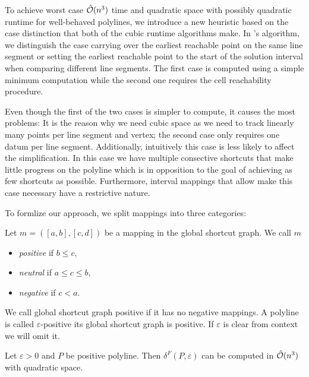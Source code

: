 To achieve worst case \(\hat{\mathcal{O}}(n^3)\) time and quadratic space with possibly quadratic runtime for well-behaved polylines, we introduce a new heuristic based on the case distinction that both of the cubic runtime algorithms make. In \citeauthor{polyline_simplification_has_cubic_complexity_bringmannetal}'s algorithm, we distinguish the case carrying over the earliest reachable point on the same line segment or setting the earliest reachable point to the start of the solution interval when comparing different line segments. The first case is computed using a simple minimum computation while the second one requires the cell reachability procedure.

Even though the first of the two cases is simpler to compute, it causes the most problems: It is the reason why we need cubic space as we need to track linearly many points per line segment and vertex; the second case only requires one datum per line segment. Additionally, intuitively this case is less likely to affect the simplification. In this case we have multiple consective shortcuts that make little progress on the polyline which is in opposition to the goal of achieving as few shortcuts as possible. Furthermore, interval mappings that allow make this case necessary have a restrictive nature. 

To formlize our approach, we split mappings into three categories:
\begin{definition}
	Let \(m = ([a, b], [c, d])\) be a mapping in the global shortcut graph. We call \(m\)
	\begin{itemize}
		\item \emph{positive} if \(b \leq c\),
		\item \emph{neutral} if \(a \leq c \leq b\),
		\item \emph{negative} if \(c < a\).
	\end{itemize}

	We call global shortcut graph positive if it has no negative mappings. A polyline is called \(\varepsilon\)-positive its global shortcut graph is positive. If \(\varepsilon\) is clear from context we will omit it.
\end{definition}

\begin{theorem}
	Let \(\varepsilon > 0\) and \(P\) be positive polyline. Then \(\delta^F(P, \varepsilon)\) can be computed in \(\hat{\mathcal{O}}(n^3)\) with quadratic space.
\end{theorem}

